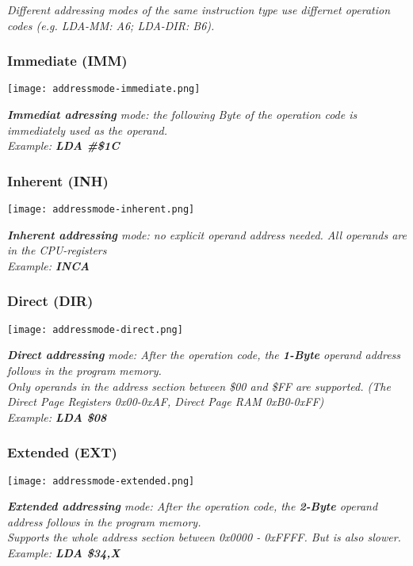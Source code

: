 \textit{
    Different addressing modes of the same instruction type use differnet
    operation codes (e.g. LDA-MM: A6; LDA-DIR: B6). \\
}

\subsubsection{Immediate (IMM)}

\texttt{[image: addressmode-immediate.png]}

\textit{
    \textbf{Immediat adressing} mode: the following Byte of the operation code
    is immediately used as the operand. \\
    Example: \textbf{LDA \#\$1C}
}

\subsubsection{Inherent (INH)}

\texttt{[image: addressmode-inherent.png]}

\textit{
    \textbf{Inherent addressing} mode: no explicit operand address needed.
    All operands are in the CPU-registers \\
    Example: \textbf{INCA}
}

\subsubsection{Direct (DIR)}

\texttt{[image: addressmode-direct.png]}

\textit{
    \textbf{Direct addressing} mode: After the operation code, the
    \textbf{1-Byte} operand address follows in the program memory. \\
    Only operands in the address section between \$00 and \$FF are
    supported. (The Direct Page Registers 0x00-0xAF, Direct Page RAM 0xB0-0xFF) \\
    Example: \textbf{LDA \$08}
}

\subsubsection{Extended (EXT)}

\texttt{[image: addressmode-extended.png]}

\textit{
    \textbf{Extended addressing} mode: After the operation code, the \textbf{2-Byte}
    operand address follows in the program memory. \\
    Supports the whole address section between 0x0000 - 0xFFFF. But is also slower. \\
    Example: \textbf{LDA \$34,X}
}

